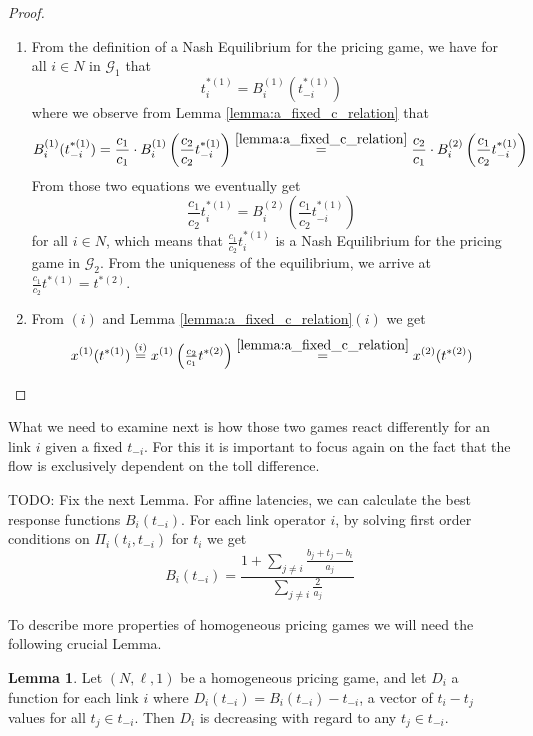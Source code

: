 \documentclass[10pt,a4paper]{book}
\newcommand{\Gm}{\mathcal{G}}
\theoremstyle{definition}
\newtheorem{lemma}[definition]{Lemma}
\theoremstyle{comment}
\begin{document}
\begin{proof}
	\begin{enumerate}[$(i)$]
		\item From the definition of a Nash Equilibrium for the pricing game, we have for all $i \in N$ in $\Gm_1$ that
		\[
			t_i^{*(1)} = B_i^{(1)}(t_{-i}^{*(1)})
		\]
		where we observe from Lemma \ref{lemma:a_fixed_c_relation} that
		\[
			B_i^{(1)}(t_{-i}^{*(1)}) = \frac{c_1}{c_1} \cdot B_i^{(1)}\left(\frac{c_2}{c_2} t_{-i}^{*(1)}\right) \stackrel{\ref{lemma:a_fixed_c_relation}}{=} \frac{c_2}{c_1} \cdot B_i^{(2)}\left(\frac{c_1}{c_2}t_{-i}^{*(1)}\right)
		\]
		From those two equations we eventually get
		\[
			\frac{c_1}{c_2} t_i^{*(1)} = B_i^{(2)}\left(\frac{c_1}{c_2} t_{-i}^{*(1)}\right)
		\]
		for all $i \in N$, which means that $\tfrac{c_1}{c_2} t_i^{*(1)}$ is a Nash Equilibrium for the pricing game in $\Gm_2$.
		From the uniqueness of the equilibrium, we arrive at $\tfrac{c_1}{c_2} t^{*(1)} = t^{*(2)}$.
		\item From $(i)$ and Lemma \ref{lemma:a_fixed_c_relation}$(i)$  we get
		\[
			x^{(1)}(t^{*(1)}) \stackrel{(i)}{=} x^{(1)}\left(\tfrac{c_2}{c_1}t^{*(2)}\right) \stackrel{\ref{lemma:a_fixed_c_relation}}{=} x^{(2)}(t^{*(2)})
		\]
	\end{enumerate}
\end{proof}

What we need to examine  next is how those two games react differently for an link $i$ given a fixed $t_{-i}$.
For this it is important to focus again on the fact that the flow is exclusively dependent on the toll difference.

TODO: Fix the next Lemma.
For affine latencies, we can calculate the best response functions $B_i(t_{-i})$.
For each link operator $i$, by solving first order conditions on $\Pi_i(t_i, t_{-i})$ for $t_i$ we get
\begin{equation}
	\label{eq:homogeneous_br_i}
	B_i(t_{-i}) = \frac{1 + \sum_{j \ne i}\frac{b_j + t_j - b_i}{a_j}}{\sum_{j \ne i}\frac{2}{a_j}}
\end{equation}


To describe more properties of homogeneous pricing games we will need the following crucial Lemma.
\begin{lemma}
	\label{lemma:tolls_diff}
	Let $(N, \ell, 1)$ be a homogeneous pricing game, and let $D_i$ a function for each link $i$ where $D_i(t_{-i}) = B_i(t_{-i}) - t_{-i}$, a vector of $t_i - t_j$ values for all $t_j \in t_{-i}$.
	Then $D_i$ is decreasing with regard to any $t_j \in t_{-i}$.
\end{lemma}
\end{document}
